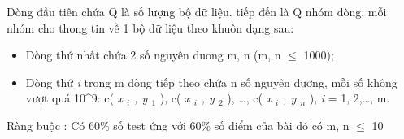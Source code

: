 Dòng đầu tiên chứa Q là số lượng bộ dữ liệu. tiếp đến là Q nhóm dòng, mỗi nhóm cho thong tin về 1 bộ dữ liệu theo khuôn dạng sau:
\begin{itemize}
	\item Dòng thứ nhất chứa 2 số nguyên duong m, n (m, n  $\le$  1000);
	\item Dòng thứ \emph{ i } trong m dòng tiếp theo chứa n số nguyên dương, mỗi số không vượt quá 10^9: c( \emph{ x $_ i $ , y $_ 1 $} ), c( \emph{ x $_ i $ , y $_ 2 $} ), …, c( \emph{ x $_ i $ , y $_ n $} ), \emph{ i } = 1, 2,…, m.
\end{itemize}

Ràng buộc : Có 60\% số test ứng với 60\% số điểm của bài đó có m, n  $\le$  10